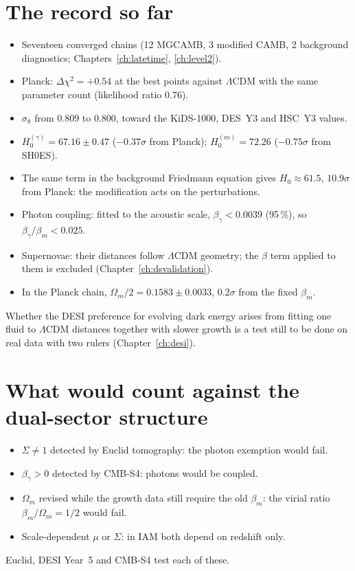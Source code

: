 \section{The record so far}
\begin{itemize}
\item Seventeen converged chains (12 MGCAMB, 3 modified CAMB, 2 background diagnostics; Chapters~\ref{ch:latetime}, \ref{ch:level2}).
\item Planck: $\Delta\chi^2=+0.54$ at the best points against $\Lambda$CDM with the same parameter count (likelihood ratio $0.76$).
\item $\sigma_8$ from $0.809$ to $0.800$, toward the KiDS-1000, DES~Y3 and HSC~Y3 values.
\item $H_0^{(\gamma)}=67.16\pm0.47$ ($-0.37\sigma$ from Planck); $H_0^{(m)}=72.26$ ($-0.75\sigma$ from SH0ES).
\item The same term in the background Friedmann equation gives $H_0\approx61.5$, $10.9\sigma$ from Planck: the modification acts on the perturbations.
\item Photon coupling: fitted to the acoustic scale, $\beta_\gamma<0.0039$ (95\,\%), so $\beta_\gamma/\beta_m<0.025$.
\item Supernovae: their distances follow $\Lambda$CDM geometry; the $\beta$ term applied to them is excluded (Chapter~\ref{ch:dsvalidation}).
\item In the Planck chain, $\Omega_m/2=0.1583\pm0.0033$, $0.2\sigma$ from the fixed $\beta_m$.
\end{itemize}
Whether the DESI preference for evolving dark energy arises from fitting one fluid to $\Lambda$CDM distances together with slower growth is a test still to be done
on real data with two rulers (Chapter~\ref{ch:desi}).

\section{What would count against the dual-sector structure}
\begin{itemize}
\item $\Sigma\neq1$ detected by Euclid tomography: the photon exemption would fail.
\item $\beta_\gamma>0$ detected by CMB-S4: photons would be coupled.
\item $\Omega_m$ revised while the growth data still require the old $\beta_m$: the virial ratio $\beta_m/\Omega_m=1/2$ would fail.
\item Scale-dependent $\mu$ or $\Sigma$: in IAM both depend on redshift only.
\end{itemize}
Euclid, DESI Year~5 and CMB-S4 test each of these.
